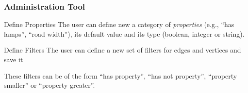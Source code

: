 \subsubsection{Administration Tool}

\begin{numerate}[FFA]
	\item[Define Properties] The user can define new a category of \textit{properties} (e.g., ``has lamps'', ``road width''), its default value and its type (boolean, integer or string).
	\item[Define Filters] The user can define a new set of filters for edges and vertices and save it
		\begin{addmargin}[7mm]{0mm}
			These filters can be of the form ``has property'', ``has not property'', ``property smaller'' or ``property greater''.
		\end{addmargin}
\end{numerate}